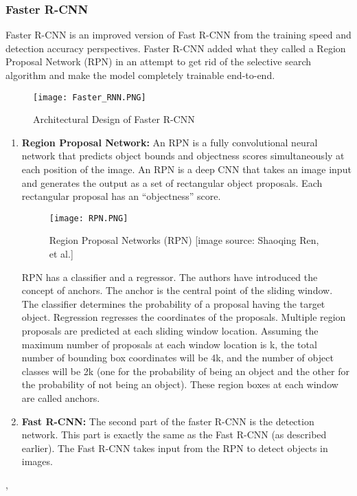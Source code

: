 \subsubsection{Faster R-CNN}
Faster R-CNN is an improved version of Fast R-CNN from the training speed and detection accuracy perspectives.
Faster R-CNN added what they called a Region Proposal Network (RPN) in an attempt to get rid of the selective search algorithm and make the model completely trainable end-to-end.

\begin{figure}[H]
    \centering
    \texttt{[image: Faster\_RNN.PNG]}
    \caption{Architectural Design of Faster R-CNN}
    \label{fig:Faster R-CNN}
\end{figure}

\begin{enumerate}
    \item \textbf{Region Proposal Network: } An RPN is a fully convolutional neural network that predicts object bounds and objectness scores simultaneously at each position of the image.
    An RPN is a deep CNN that takes an image input and generates the output as a set of rectangular object proposals. Each rectangular proposal has an “objectness” score.
    
    \begin{figure}[H]
        \centering
        \texttt{[image: RPN.PNG]}
        \caption{Region Proposal Networks (RPN) [image source: Shaoqing Ren, et al.]}
        \label{fig:RPN}
    \end{figure}
    RPN has a classifier and a regressor. The authors have introduced the concept of anchors. The anchor is the central point of the sliding window.
    The classifier determines the probability of a proposal having the target object. Regression
    regresses the coordinates of the proposals.
    Multiple region proposals are predicted at each sliding window location. Assuming the maximum number of proposals at each window location is k, the total number of bounding box coordinates will be 4k, and the number of object classes will be 2k (one for the probability of being an object and the other for the probability of not being an object). These region boxes at each window are called anchors.\\
    \item \textbf{Fast R-CNN: } The second part of the faster R-CNN is the detection network. This part is exactly the same as the Fast R-CNN (as described earlier). The Fast R-CNN takes input from the RPN to detect objects in images. 
\end{enumerate} \cite{ansari2020building}, \cite{salvador2016faster}


